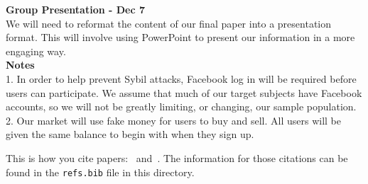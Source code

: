 \documentclass[12pt]{article}
\begin{document}
\noindent
\textbf{Group Presentation - Dec 7} \\
We will need to reformat the content of our final paper into a presentation
format. This will involve using PowerPoint to present our information in
a more engaging way.\\

\noindent
\textbf{Notes} \\
1. In order to help prevent Sybil attacks, Facebook log in will be required before users can participate. We assume that much of our target subjects have Facebook accounts, so we will not be greatly limiting, or changing, our sample population.\\
2. Our market will use fake money for users to buy and sell. All users will be given the same balance to begin with when they sign up.


This is how you cite papers:~\cite{Othman13:Gates} and~\cite{Pennock01:Real}.  The information for those citations can be found in the \texttt{refs.bib} file in this directory.



\end{document}
